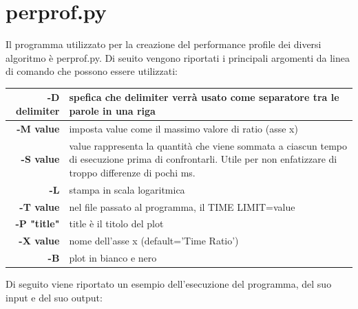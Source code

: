 \section{perprof.py}
Il programma utilizzato per la creazione del performance profile dei diversi algoritmo è perprof.py\cite{salvagnin_perf}. Di seuito vengono riportati i principali argomenti da linea di comando che possono essere utilizzati:

\begin{table}[h]
\begin{tabular}{|r|l|}
\hline
\textbf{-D delimiter} & {spefica che delimiter verrà usato come separatore tra le parole in una riga}\\
\hline
\textbf{-M value} & {imposta value come il massimo valore di ratio (asse x)}\\
\hline
\textbf{-S value} & {value rappresenta la quantità che viene sommata a ciascun tempo di esecuzione prima di confrontarli. Utile per non enfatizzare di troppo differenze di pochi ms.}\\
\hline
\textbf{-L} & {stampa in scala logaritmica}\\
\hline
\textbf{-T value} & {nel file passato al programma, il TIME LIMIT=value}\\
\hline
\textbf{-P "title"} & {title è il titolo del plot}\\
\hline
\textbf{-X value} & {nome dell'asse x (default='Time Ratio')}\\
\hline
\textbf{-B} & {plot in bianco e nero}\\
\hline
\end{tabular}
\end{table}
Di seguito viene riportato un esempio dell'esecuzione del programma, del suo input e del suo output:
